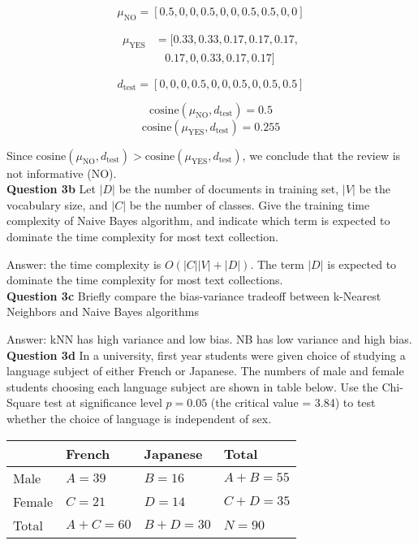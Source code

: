 \documentclass[11pt,a4paper]{report}
\begin{document}
\begin{multicols*}{2}
$$\mu_{\text{NO}} = [0.5, 0, 0, 0.5, 0, 0, 0.5, 0.5, 0, 0]$$

\begin{equation*}
\begin{split}
\mu_{\text{YES}} &= [0.33, 0.33, 0.17, 0.17, 0.17, \\
&\ \ \ \ 0.17, 0, 0.33, 0.17, 0.17]
\end{split}
\end{equation*}

$$d_{\text{test}} = [0,0,0,0.5,0,0,0.5,0,0.5,0.5]$$

$$\text{cosine}(\mu_{\text{NO}}, d_{\text{test}}) = 0.5$$
$$\text{cosine}(\mu_{\text{YES}}, d_{\text{test}}) = 0.255$$

\noindent Since $\text{cosine}(\mu_{\text{NO}}, d_{\text{test}}) > \text{cosine}(\mu_{\text{YES}}, d_{\text{test}})$, we conclude that the review is not informative (NO). \\

\noindent \textbf{Question 3b} Let $|D|$ be the number of documents in training set, $|V|$ be the vocabulary size, and $|C|$ be the number of classes. Give the training time complexity of Naive Bayes algorithm, and indicate which term is expected to dominate the time complexity for most text collection.

\noindent Answer: the time complexity is $O(|C||V|+|D|)$. The term $|D|$ is expected to dominate the time complexity for most text collections. \\

\noindent \textbf{Question 3c} Briefly compare the bias-variance tradeoff between k-Nearest Neighbors and Naive Bayes algorithms

\noindent Answer: kNN has high variance and low bias. NB has low variance and high bias.\\

\noindent \textbf{Question 3d} In a university, first year students were given choice of studying a language subject of either French or Japanese. The numbers of male and female students choosing each language subject are shown in table below. Use the Chi-Square test at significance level $p=0.05$ (the critical value = 3.84) to test whether the choice of language is independent of sex.

\scriptsize
\begin{center}
\begin{tabular}{ |l|l|l|l| } 
    \hline
            & French     & Japanese   & Total \\
    \hline 
    Male    & $A = 39$   & $B = 16$   & $A+B=55$ \\
    Female  & $C = 21$   & $D = 14$   & $C+D=35$ \\
    Total   & $A+C = 60$ & $B+D = 30$ & $N=90$ \\
    \hline
\end{tabular}
\end{center}
\normalsize


\end{multicols*}
\end{document}
